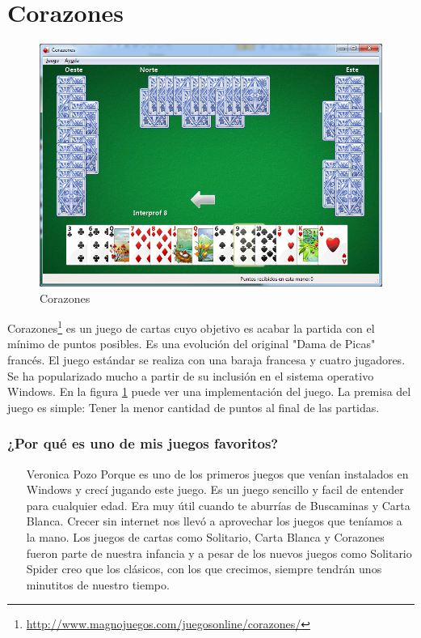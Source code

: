 \section{Corazones}

\begin{figure}[htbp]
\begin{center}
\includegraphics[width=.60\textwidth]{./imagenes/Corazones.png}
\caption{Corazones}
\label{Corazones}
\end{center}
\end{figure}
Corazones\footnote{\url{http://www.magnojuegos.com/juegosonline/corazones/}} es un juego de cartas cuyo objetivo es acabar la partida con el mínimo de puntos posibles. Es una evolución del original "Dama de Picas" francés. El juego estándar se realiza con una baraja francesa y cuatro jugadores. Se ha popularizado mucho a partir de su inclusión en el sistema operativo Windows.
En la figura \ref{Corazones} puede ver una implementación del juego.
La premisa del juego es simple: Tener la menor cantidad de puntos al final de las partidas.

\subsubsection{¿Por qué es uno de mis juegos favoritos?}
\begin{itemize}
\item[Veronica Pozo] Porque es uno de los primeros juegos que venían instalados en Windows y crecí jugando este juego. Es un juego sencillo y facil de entender para cualquier edad. Era muy útil cuando te aburrías de Buscaminas y Carta Blanca. Crecer sin internet nos llevó a aprovechar los juegos que teníamos a la mano. Los juegos de cartas como Solitario, Carta Blanca y Corazones fueron parte de nuestra infancia y a pesar de los nuevos juegos como Solitario Spider creo que los clásicos, con los que crecimos, siempre tendrán unos minutitos de nuestro tiempo.
\end{itemize}
